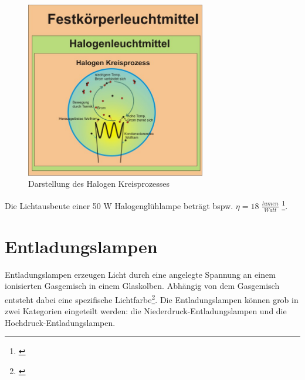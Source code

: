 \begin{figure}[H]     %
\centering
\includegraphics[width=0.7\textwidth]{bilder/halogenkreis} 
\caption {Darstellung des Halogen Kreisprozesses\protect\footnotemark}\label{b_halogenkreis}
\end{figure}

\noindent Die Lichtausbeute einer 50 W Halogenglühlampe beträgt bspw. $\eta=18$ $\frac{lumen}{Watt}$ \footnote{\cite[35]{greule}}.

\section{Entladungslampen} \label{sec_entladungslampe}
Entladungslampen erzeugen Licht durch eine angelegte Spannung an einem ionisierten Gasgemisch in einem Glaskolben. Abhängig von dem Gasgemisch entsteht dabei eine spezifische Lichtfarbe\footnote{\cite[140]{mueller}}. Die Entladungslampen können grob in zwei Kategorien eingeteilt werden: die Niederdruck-Entladungslampen und die Hochdruck-Entladungslampen.\\

